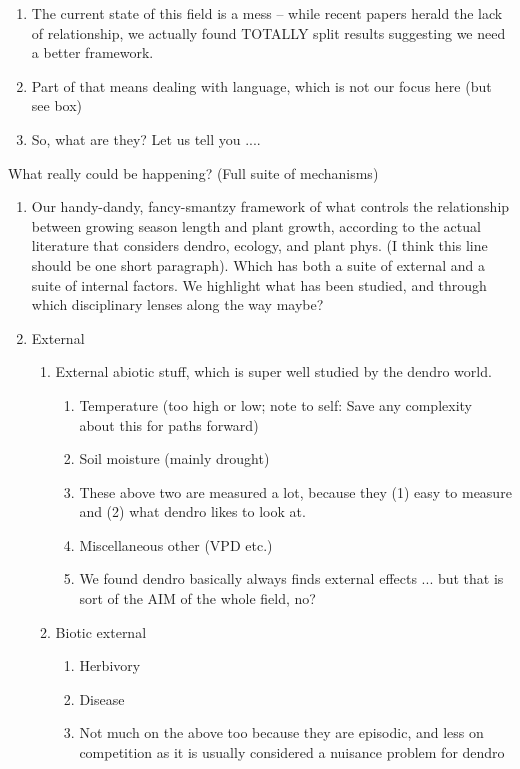 \documentclass[11pt,letter]{article}
\begin{document}
\begin{enumerate}
\begin{enumerate}
\begin{enumerate}
\item The current state of this field is a mess -- while recent papers herald the lack of relationship, we actually found TOTALLY split results suggesting we need a better framework.
\item Part of that means dealing with language, which is not our focus here (but see box)
\item So, what are they? Let us tell you .... %
\end{enumerate}
\end{enumerate}
\end{enumerate}
\item What really could be happening? (Full suite of mechanisms)
\begin{enumerate}
\item Our handy-dandy, fancy-smantzy framework of what controls the relationship between growing season length and plant growth, according to the actual literature that considers dendro, ecology, and plant phys. (I think this line should be one short paragraph). Which has both a suite of external and a suite of internal factors. We highlight what has been studied, and through which disciplinary lenses along the way maybe?
\item External 
\begin{enumerate}
\item External abiotic stuff, which is super well studied by the dendro world. 
\begin{enumerate}
\item Temperature (too high or low; note to self: Save any complexity about this for paths forward)
\item Soil moisture (mainly drought)
\item These above two are measured a lot, because they (1) easy to measure and (2) what dendro likes to look at. 
\item Miscellaneous other (VPD etc.)
\item We found dendro basically always finds external effects ... but that is sort of the AIM of the whole field, no? 
\end{enumerate}
\item Biotic external 
\begin{enumerate}
\item Herbivory
\item Disease
\item Not much on the above too because they are episodic, and less on competition as it is usually considered a nuisance problem for dendro

\end{enumerate}
\end{enumerate}
\end{enumerate}
\end{document}
